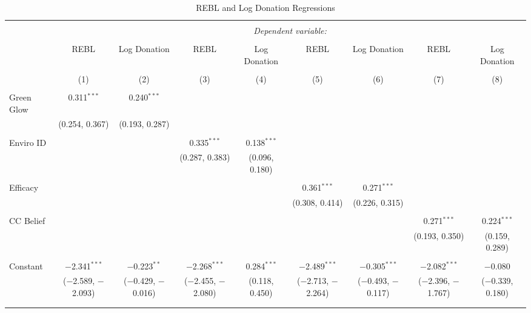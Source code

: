 
\begin{table}[!htbp] \centering 
  \caption{REBL and Log Donation Regressions} 
  \label{} 
\scriptsize 
\begin{tabular}{@{\extracolsep{1pt}}lcccccccc} 
\\[-1.8ex]\hline 
\hline \\[-1.8ex] 
 & \multicolumn{8}{c}{\textit{Dependent variable:}} \\ 
\cline{2-9} 
\\[-1.8ex] & REBL & Log Donation & REBL & Log Donation & REBL & Log Donation & REBL & Log Donation \\ 
\\[-1.8ex] & (1) & (2) & (3) & (4) & (5) & (6) & (7) & (8)\\ 
\hline \\[-1.8ex] 
 Green Glow & 0.311$^{***}$ & 0.240$^{***}$ &  &  &  &  &  &  \\ 
  & (0.254, 0.367) & (0.193, 0.287) &  &  &  &  &  &  \\ 
  & & & & & & & & \\ 
 Enviro ID &  &  & 0.335$^{***}$ & 0.138$^{***}$ &  &  &  &  \\ 
  &  &  & (0.287, 0.383) & (0.096, 0.180) &  &  &  &  \\ 
  & & & & & & & & \\ 
 Efficacy &  &  &  &  & 0.361$^{***}$ & 0.271$^{***}$ &  &  \\ 
  &  &  &  &  & (0.308, 0.414) & (0.226, 0.315) &  &  \\ 
  & & & & & & & & \\ 
 CC Belief &  &  &  &  &  &  & 0.271$^{***}$ & 0.224$^{***}$ \\ 
  &  &  &  &  &  &  & (0.193, 0.350) & (0.159, 0.289) \\ 
  & & & & & & & & \\ 
 Constant & $-$2.341$^{***}$ & $-$0.223$^{**}$ & $-$2.268$^{***}$ & 0.284$^{***}$ & $-$2.489$^{***}$ & $-$0.305$^{***}$ & $-$2.082$^{***}$ & $-$0.080 \\ 
  & ($-$2.589, $-$2.093) & ($-$0.429, $-$0.016) & ($-$2.455, $-$2.080) & (0.118, 0.450) & ($-$2.713, $-$2.264) & ($-$0.493, $-$0.117) & ($-$2.396, $-$1.767) & ($-$0.339, 0.180) \\ 
  & & & & & & & & \\ 
\hline \\[-1.8ex] 

\end{tabular}
\end{table}
